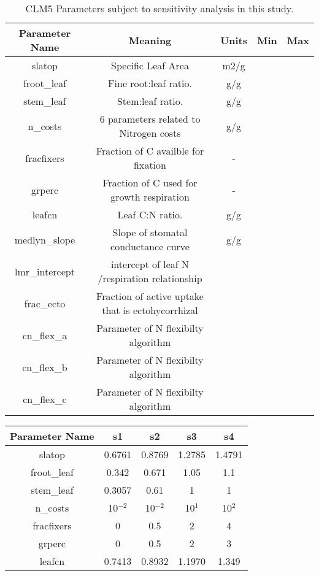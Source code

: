 \documentclass[draft,linenumbers]{agujournal}
\begin{document}
{\pagebreak
\begin{table}
\begin{center}
\begin{tabular}{ |c|c|c|c|c| } 
 \hline
 Parameter Name & Meaning & Units & Min & Max \\
  \hline
 slatop & Specific Leaf Area & m2/g \\ 
 froot\_leaf & Fine root:leaf ratio. & g/g \\
 stem\_leaf  & Stem:leaf ratio. & g/g \\ 
 n\_costs    & 6 parameters related to Nitrogen costs & g/g \\
 fracfixers  & Fraction of C availble for fixation & - \\
  grperc  & Fraction of C used for growth respiration  & - \\
  leafcn  & Leaf C:N ratio. & g/g \\
     medlyn\_slope  & Slope of stomatal conductance curve & g/g \\
      lmr\_intercept & intercept of leaf N /respiration relationship &\\
      frac\_ecto & Fraction of active uptake that is ectohycorrhizal & \\
      cn\_flex\_a & Parameter of N flexibilty algorithm& \\
      cn\_flex\_b & Parameter of N flexibilty algorithm & \\
      cn\_flex\_c & Parameter of N flexibilty algorithm & \\
\hline
\end{tabular}
\end{center}
\caption{CLM5 Parameters subject to sensitivity analysis in this study. }
\label{table_parameters}
\end{table}


 \begin{table}
\begin{center}
\begin{tabular}{ |c|c|c|c|c| } 
 \hline
 Parameter Name & s1 &s2 & s3 & s4\\
  \hline
 slatop & 0.6761 & 0.8769 &1.2785 &1.4791\\ 
 froot\_leaf &  0.342 &0.671 &1.05 & 1.1\\
 stem\_leaf  &  0.3057 &0.61 &1 &1\\ 
 n\_costs    & 10$^{-2}$ &10$^{-2}$&  10$^{1}$& 10$^{2}$\\
 fracfixers  & 0 &0.5 & 2 & 4 \\
  grperc  &  0 & 0.5& 2 & 3\\
  leafcn  &0.7413 & 0.8932 & 1.1970  & 1.349\\
  

\end{tabular}
\end{center}
\end{table}}
\end{document}
